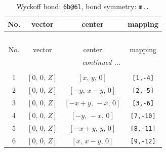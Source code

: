 \documentclass[fleqn,8pt]{jsarticle}
\begin{document}
\begin{longtable}{cccc}
\caption{Wyckoff bond: {\tt 6b@6l}, bond symmetry: {\tt m..}}
 \\
 \hline \hline
No. & vector & center & mapping \\ \hline \endfirsthead

\multicolumn{3}{l}{\tablename\ \thetable{}} \\
 \hline \hline
No. & vector & center & mapping \\ \hline \endhead

 \hline \hline
\multicolumn{3}{r}{\footnotesize\it continued ...} \\ \endfoot

 \hline \hline
\multicolumn{3}{r}{} \\ \endlastfoot

1 & $\left[ 0,\, 0,\, Z \right]$ & $\left[ x,\, y,\, 0 \right]$ & {\tt [1,-4]} \\ \hline
2 & $\left[ 0,\, 0,\, Z \right]$ & $\left[ - y,\, x - y,\, 0 \right]$ & {\tt [2,-5]} \\ \hline
3 & $\left[ 0,\, 0,\, Z \right]$ & $\left[ - x + y,\, - x,\, 0 \right]$ & {\tt [3,-6]} \\ \hline
4 & $\left[ 0,\, 0,\, Z \right]$ & $\left[ - y,\, - x,\, 0 \right]$ & {\tt [7,-10]} \\ \hline
5 & $\left[ 0,\, 0,\, Z \right]$ & $\left[ - x + y,\, y,\, 0 \right]$ & {\tt [8,-11]} \\ \hline
6 & $\left[ 0,\, 0,\, Z \right]$ & $\left[ x,\, x - y,\, 0 \right]$ & {\tt [9,-12]} \\
\end{longtable}
\renewcommand{\arraystretch}{1.2}
\end{document}

